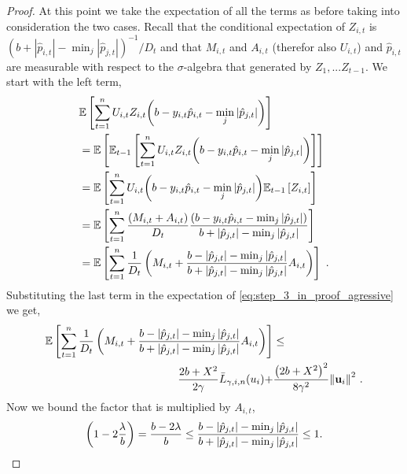 \begin{proof}
At this point we take  the expectation of all the terms as before taking into consideration the two cases.  Recall that the conditional expectation of $Z_{i,t}$ is
$(b+|\hat{p}_{i,t}|-\min_j| \hat{p}_{j,t}|)^{-1}/D_{t}$
and that $M_{i,t}$ and $A_{i,t}$ (therefor also $U_{i,t}$) and $\hat{p}_{i,t}$ are measurable with respect to the $\sigma$-algebra that generated by $Z_1,...Z_{t-1}$. 
We start with the left term,
\begin{align*}
\begin{split}
&\mathbb{E}\left[{\sum_{t=1}^{n}U_{i,t}Z_{i,t}{\left({b-y_{i,t}\hat{p}_{i,t}-\min_{j}{\left\vert{ \hat{p}_{j,t}}\right\vert}}\right)}}\right]\\
&=\mathbb{E}\left[{\mathbb{E}_{t-1}\left[{{\sum_{t=1}^{n}{U_{i,t}Z_{i,t}{\left(b-y_{i,t}\hat{p}_{i,t}-\min_{j}{\left\vert{\hat{p}_{j,t}}\right\vert}\right)}}}}\right]}\right] \\
&=\mathbb{E}\left[{{\sum_{t=1}^{n}U_{i,t}{\left({b -y_{i,t}\hat{p}_{i,t}}-\min_{j}{\left\vert \hat{p}_{j,t} \right\vert}\right)}\mathbb{E}_{t-1}\left[{ Z_{i,t}}\right]}}\right]\\
&=\mathbb{E}\left[{\sum_{t=1}^{n}\frac{\left({M_{i,t}+A_{i,t}}\right)}{D_{t}}\frac{\left({b -y_{i,t}\hat{p}_{i,t}-\min_{j}\left\vert{\hat{p}_{j,t}}\right\vert}\right)}{b+\left\vert{\hat{p}_{j,t}}\right\vert-\min_{j}{\left\vert{\hat{p}_{j,t}}\right\vert}}}\right]\\
&=\mathbb{E}\left[{\sum_{t=1}^{n}{\frac{1}{D_{t}}\left({M_{i,t}+\frac{b-\left\vert{\hat{p}_{j,t}}\right\vert-\min_{j}{\left\vert{\hat{p}_{j,t}}\right\vert }}{b+\left\vert{\hat{p}_{j,t}}\right\vert-\min_{j}{\left\vert{\hat{p}_{j,t}}\right\vert}}A_{i,t} }\right)}}\right]~.
\end{split}
\end{align*}
Substituting the last term in the expectation of
\eqref{eq:step_3_in_proof_agressive} we get,
\begin{equation}
\begin{split}
\mathbb{E}\left[ \sum_{t=1}^{n}{\frac{1}{D_{t}}}\left({M_{i,t}+\frac{b-\left\vert{\hat{p}_{j,t}}\right\vert-\min_{j}{\left\vert{\hat{p}_{j,t}}\right\vert }}{b+\left\vert{\hat{p}_{j,t}}\right\vert-\min_{j}{\left\vert{\hat{p}_{j,t}}\right\vert}}A_{i,t} }\right) \right]
&\le \\ \frac{2b+X^2}{2\gamma}{\bar
  L}_{\gamma,i,n}(u_i)+&\frac{\left({2b+X^2}\right)^2}{8{\gamma}^2}{\left\Vert
    \mathbf{u}_{i} \right\Vert}^2~.
\label{step_3_in_proof_aggressive}
\end{split}
\end{equation} 
Now we bound the factor that is multiplied by $A_{i,t}$,
\begin{equation}
\paren{1-2\frac{\lambda}{b}}=\frac{b-2\lambda}{b} \le\frac{b-\abs{\hat{p}_{j,t}}-\min_{j}{\abs{\hat{p}_{j,t}} }}{b+\abs{\hat{p}_{j,t}}-\min_{j}{\abs{\hat{p}_{j,t}}}}\le1.

\end{equation}
\end{proof}
